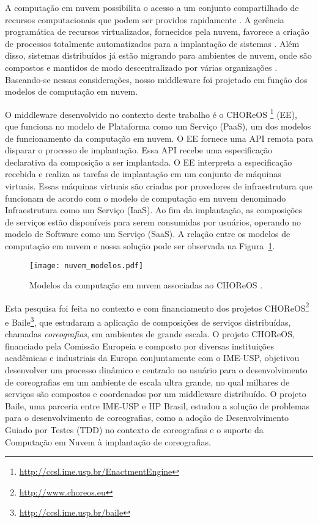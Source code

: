 A computação em nuvem possibilita o acesso a um conjunto compartilhado de recursos computacionais que podem ser providos rapidamente \cite{Nist2011Cloud}.
A gerência programática de recursos virtualizados, fornecidos pela nuvem, favorece a criação de processos totalmente automatizados para a implantação de sistemas \cite{Humble2011Continuous}.   
Além disso, sistemas distribuídos já estão migrando para ambientes de nuvem, onde são compostos e mantidos de modo descentralizado por várias organizações \cite{Steen2011VeryLarge}.
Baseando-se nessas considerações, nosso middleware foi projetado em função dos modelos de computação em nuvem.

O middleware desenvolvido no contexto deste trabalho é o CHOReOS \ee 
\footnote{\url{http://ccsl.ime.usp.br/EnactmentEngine}} (EE),
que funciona no modelo de Plataforma como um Serviço (PaaS), 
um dos modelos de funcionamento da computação em nuvem.
O EE fornece uma API remota para disparar o processo de implantação.
Essa API recebe uma especificação declarativa da composição a ser implantada.
O EE interpreta a especificação recebida e realiza as tarefas de implantação
em um conjunto de máquinas virtuais.
Essas máquinas virtuais são criadas por provedores de infraestrutura que funcionam
de acordo com o modelo de computação em nuvem denominado Infraestrutura como um Serviço (IaaS).
Ao fim da implantação, as composições de serviços estão disponíveis para serem consumidas
por usuários, operando no modelo de Software como um Serviço (SaaS).
A relação entre os modelos de computação em nuvem e nossa solução
pode ser observada na Figura~\ref{fig:modelos_nuvem}. 

\begin{figure}[!h]
  \centering
  \texttt{[image: nuvem\_modelos.pdf]} 
  \caption{Modelos da computação em nuvem associadas ao CHOReOS \ee.}
  \label{fig:modelos_nuvem} 
\end{figure}

Esta pesquisa foi feita no contexto e com financiamento dos projetos CHOReOS\footnote{\url{http://www.choreos.eu}} e Baile\footnote{\url{http://ccsl.ime.usp.br/baile}}, que estudaram a aplicação de composições de serviços distribuídas, chamadas \emph{coreografias}, em ambientes de grande escala. O projeto CHOReOS, financiado pela Comissão Europeia e composto por diversas instituições acadêmicas e industriais da Europa conjuntamente com o IME-USP, objetivou desenvolver um processo dinâmico e centrado no usuário para o desenvolvimento de coreografias em um ambiente de escala ultra grande, no qual milhares de serviços são compostos e coordenados por um middleware distribuído. O projeto Baile, uma parceria entre IME-USP e HP Brasil, estudou a solução de problemas para o desenvolvimento de coreografias, como a adoção de Desenvolvimento Guiado por Testes (TDD) no contexto de coreografias e o suporte da Computação em Nuvem à implantação de coreografias. 

